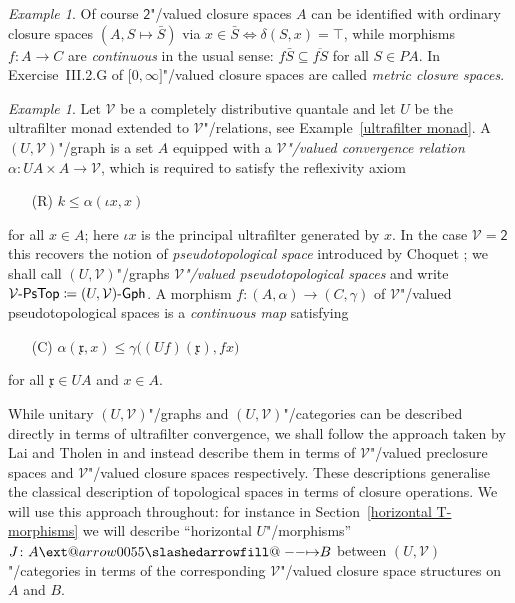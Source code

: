 \documentclass[preprint, a4paper]{elsarticle}
\makeatletter
\def\slashedarrowfill@#1#2#3#4#5{%
  $\m@th\thickmuskip0mu\medmuskip\thickmuskip\thinmuskip\thickmuskip
   \relax#5#1\mkern-7mu%
   \cleaders\hbox{$#5\mkern-2mu#2\mkern-2mu$}\hfill
   \mathclap{#3}\mathclap{#2}%
   \cleaders\hbox{$#5\mkern-2mu#2\mkern-2mu$}\hfill
   \mkern-7mu#4$%
}
\def\rightslashedarrowfill@{%
  \slashedarrowfill@\relbar\relbar\mapstochar\rightarrow}
\newcommand\xslashedrightarrow[2][]{%
  \ext@arrow 0055{\rightslashedarrowfill@}{#1}{#2}}
\def\slashedrightarrow{\xslashedrightarrow{}}
\theoremstyle{definition}
\theoremstyle{remark}
\newtheorem{example}[theorem]{Example}
\providecommand{\exref}[1]{Example~\ref{#1}}
\providecommand{\secref}[1]{Section~\ref{#1}}
\renewcommand{\iff}{\Leftrightarrow}
\providecommand{\dfn}{\coloneqq}
\providecommand{\mf}[1]{\mathfrak{#1}}
\providecommand{\brks}[1]{\lbrack #1 \rbrack}
\providecommand{\bigpars}[1]{\bigl(#1\bigr)}
\providecommand{\map}[3]{#1\colon#2\to#3}
\providecommand{\hmap}[3]{#1\colon#2\slashedrightarrow#3}
\providecommand{\catvar}[1]{\mathcal{#1}}
\providecommand{\2}{\mathsf 2}
\providecommand{\V}{\catvar V}
\providecommand{\PsTop}[1]{#1\text-\mathsf{PsTop}}
\providecommand{\Gph}[1]{#1\text-\mathsf{Gph}}
\makeatother
\begin{document}
\begin{example}
		Of course $\2$"/valued closure spaces $A$ can be identified with ordinary closure spaces $(A, S \mapsto \bar S)$ via $x \in \bar S \iff \delta(S, x) = \top$, while morphisms $\map fAC$ are \emph{continuous} in the usual sense: $f\bar S \subseteq \overline{fS}$ for all $S \in PA$. In Exercise~III.2.G of \cite{Hofmann-Seal-Tholen14} $\brks{0, \infty}$"/valued closure spaces are called \emph{metric closure spaces}.
  \end{example}
  
  \begin{example} \label{pseudotopological space}
  	Let $\V$ be a completely distributive quantale and let $U$ be the ultrafilter monad extended to $\V$"/relations, see \exref{ultrafilter monad}. A $(U, \V)$"/graph is a set $A$ equipped with a \emph{$\V$"/valued convergence relation} $\map\alpha{UA \times A}\V$, which is required to satisfy the reflexivity axiom
  	\begin{enumerate}
  		\item[(R)] $k \leq \alpha(\iota x, x)$
  	\end{enumerate}
  	for all $x \in A$; here $\iota x$ is the principal ultrafilter generated by $x$. In the case $\V = \2$ this recovers the notion of \emph{pseudotopological space} introduced by Choquet \cite{Choquet48}; we shall call $(U, \V)$"/graphs \emph{$\V$"/valued pseudotopological spaces} and write $\PsTop\V \dfn \Gph{(U, \V)}$. A morphism $\map f{(A, \alpha)}{(C, \gamma)}$ of $\V$"/valued pseudotopological spaces is a \emph{continuous map} satisfying
  	\begin{enumerate}
  		\item[(C)] $\alpha(\mf x, x) \leq \gamma\bigpars{(Uf)(\mf x), fx}$
  	\end{enumerate}
  	for all $\mf x \in UA$ and $x \in A$.
  \end{example}
  
  While unitary $(U, \V)$"/graphs and $(U, \V)$"/categories can be described directly in terms of ultrafilter convergence, we shall follow the approach taken by Lai and Tholen in \cite{Lai-Tholen17a} and instead describe them in terms of $\V$"/valued preclosure spaces and $\V$"/valued closure spaces respectively. These descriptions generalise the classical description of topological spaces in terms of closure operations. We will use this approach throughout: for instance in \secref{horizontal T-morphisms} we will describe ``horizontal $U$"/morphisms'' $\hmap JAB$ between $(U, \V)$"/categories in terms of the corresponding $\V$"/valued closure space structures on $A$ and $B$.
  
\end{document}
